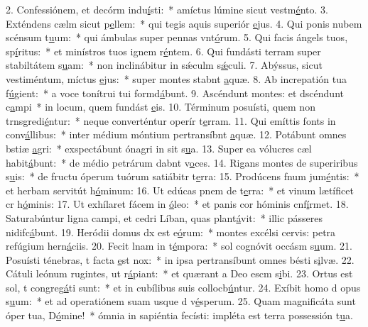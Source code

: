 2. Confessiónem, et decórm indu\uline{í}sti:~* amíctus lúmine sicut vestm\uline{é}nto.
3. Exténdens cælm sicut p\uline{e}llem:~* qui tegis aquis superiór \uline{e}jus.
4. Qui ponis nubem scénsum t\uline{u}um:~* qui ámbulas super pennas vnt\uline{ó}rum.
5. Qui facis ángels tuos, sp\uline{í}ritus:~* et minístros tuos ignem r\uline{é}ntem.
6. Qui fundásti terram super stabiltátem s\uline{u}am:~* non inclinábitur in sǽculm s\uline{ǽ}culi.
7. Abýssus, sicut vestiméntum, míctus \uline{e}jus:~* super montes stabnt \uline{a}quæ.
8. Ab increpatión tua f\uline{ú}gient:~* a voce tonítrui tui formd\uline{á}bunt.
9. Ascéndunt montes: et dscéndunt c\uline{a}mpi~* in locum, quem fundást \uline{e}is.
10. Términum posuísti, quem non trnsgredi\uline{é}ntur:~* neque converténtur operír t\uline{e}rram.
11. Qui emíttis fonts in conv\uline{á}llibus:~* inter médium móntium pertransíbnt \uline{a}quæ.
12. Potábunt omnes bstiæ \uline{a}gri:~* exspectábunt ónagri in sit s\uline{u}a.
13. Super ea vólucres cæl habit\uline{á}bunt:~* de médio petrárum dabnt v\uline{o}ces.
14. Rigans montes de superiribus s\uline{u}is:~* de fructu óperum tuórum satiábitr t\uline{e}rra:
15. Prodúcens fnum jum\uline{é}ntis:~* et herbam servitút h\uline{ó}minum:
16. Ut edúcas pnem de t\uline{e}rra:~* et vinum lætíficet cr h\uline{ó}minis:
17. Ut exhílaret fácem in \uline{ó}leo:~* et panis cor hóminis cnf\uline{í}rmet.
18. Saturabúntur ligna campi, et cedri Líban, quas plant\uline{á}vit:~* illic pásseres nidifc\uline{á}bunt.
19. Heródii domus dx est e\uline{ó}rum:~* montes excélsi cervis: petra refúgium hern\uline{á}ciis.
20. Fecit lnam in t\uline{é}mpora:~* sol cognóvit occásm s\uline{u}um.
21. Posuísti ténebras, t facta \uline{e}st nox:~* in ipsa pertransíbunt omnes bésti s\uline{i}lvæ.
22. Cátuli leónum rugintes, ut r\uline{á}piant:~* et quærant a Deo escm s\uline{i}bi.
23. Ortus est sol, t congreg\uline{á}ti sunt:~* et in cubílibus suis collocb\uline{ú}ntur.
24. Exíbit homo d opus s\uline{u}um:~* et ad operatiónem suam usque d v\uline{é}sperum.
25. Quam magnificáta sunt óper tua, D\uline{ó}mine!~* ómnia in sapiéntia fecísti: impléta est terra possessión t\uline{u}a.
